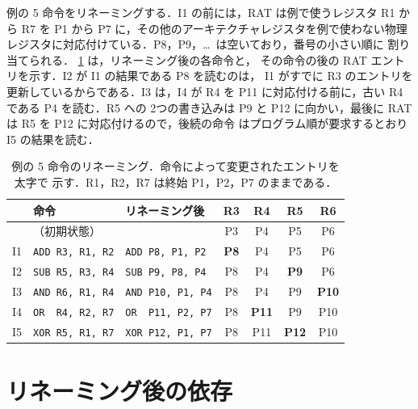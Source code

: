 \documentclass[../main.tex]{subfiles}
\begin{document}
\begin{example}
  \label{ex:l06-rename}
  例の 5 命令をリネーミングする．I1 の前には，RAT は例で使うレジスタ R1 から
  R7 を P1 から P7 に，その他のアーキテクチャレジスタを例で使わない物理
  レジスタに対応付けている．P8，P9，\ldots\ は空いており，番号の小さい順に
  割り当てられる．%
  \cref{tab:l06-rename} は，リネーミング後の各命令と，
  その命令の後の RAT エントリを示す．I2 が I1 の結果である P8 を読むのは，
  I1 がすでに R3 のエントリを更新しているからである．I3 は，I4 が R4 を
  P11 に対応付ける前に，古い R4 である P4 を読む．R5 への 2つの書き込みは
  P9 と P12 に向かい，最後に RAT は R5 を P12 に対応付けるので，後続の命令
  はプログラム順が要求するとおり I5 の結果を読む．
\end{example}

\begin{table}[htbp]
  \centering\small
  \caption{例の 5 命令のリネーミング．命令によって変更されたエントリを太字で
    示す．R1，R2，R7 は終始 P1，P2，P7 のままである．}
  \label{tab:l06-rename}
  \begin{tabular}{@{}lllcccc@{}}
    \toprule
    & 命令 & リネーミング後 & R3 & R4 & R5 & R6 \\
    \midrule
    & （初期状態） & & P3 & P4 & P5 & P6 \\
    I1 & \texttt{ADD R3, R1, R2} & \texttt{ADD P8, P1, P2}
       & \textbf{P8} & P4 & P5 & P6 \\
    I2 & \texttt{SUB R5, R3, R4} & \texttt{SUB P9, P8, P4}
       & P8 & P4 & \textbf{P9} & P6 \\
    I3 & \texttt{AND R6, R1, R4} & \texttt{AND P10, P1, P4}
       & P8 & P4 & P9 & \textbf{P10} \\
    I4 & \texttt{OR~~R4, R2, R7} & \texttt{OR~~P11, P2, P7}
       & P8 & \textbf{P11} & P9 & P10 \\
    I5 & \texttt{XOR R5, R1, R7} & \texttt{XOR P12, P1, P7}
       & P8 & P11 & \textbf{P12} & P10 \\
    \bottomrule
  \end{tabular}
\end{table}

\section{リネーミング後の依存}
\label{sec:l06-after-renaming}
\end{document}
